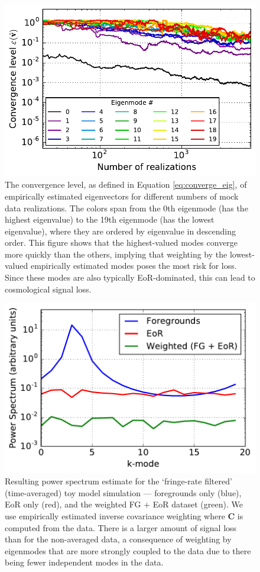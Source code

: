 \documentclass[preprint2,numberedappendix,tighten]{aastex6}
\begin{document}
\begin{figure}
	\centering
	\includegraphics[width=\columnwidth]{plots/toy_sigloss17.pdf}
	\caption{The convergence level, as defined in Equation \eqref{eq:converge_eig}, of empirically estimated eigenvectors for different numbers of mock data realizations. The colors span from the 0th eigenmode (has the highest eigenvalue) to the 19th eigenmode (has the lowest eigenvalue), where they are ordered by eigenvalue in descending order. This figure shows that the highest-valued modes converge more quickly than the others, implying that weighting by the lowest-valued empirically estimated modes poses the most risk for loss. Since these modes are also typically EoR-dominated, this can lead to cosmological signal loss.}
	\label{fig:toy_sigloss17}
\end{figure}

\begin{figure}
	\centering
	\includegraphics[trim={0cm 0cm 0cm 0cm},clip,width=\columnwidth]{plots/toy_sigloss7.pdf}
	\caption{Resulting power spectrum estimate for the `fringe-rate filtered' (time-averaged) toy model simulation --- foregrounds only (blue), 
EoR only (red), and the weighted FG + EoR dataset (green). We use empirically estimated inverse covariance weighting where $\textbf{C}$ is 
computed from the data. There is a larger amount of signal loss than for the non-averaged data, a consequence of weighting by eigenmodes that are more strongly coupled to the data due to there being fewer independent modes in the data.}
	\label{fig:toy_sigloss7}
\end{figure}
\end{document}
